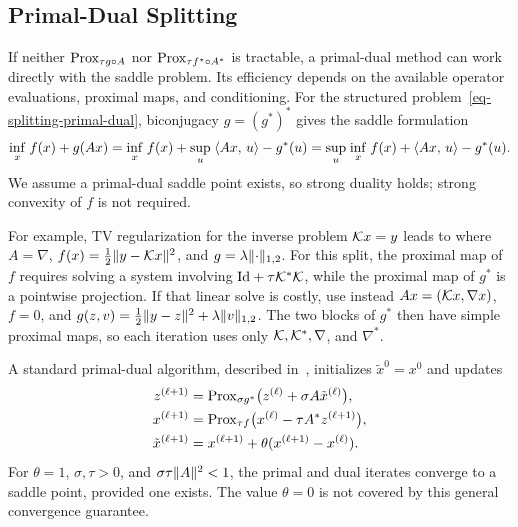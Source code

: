 \subsection{Primal-Dual Splitting}

If neither $\operatorname{Prox}_{\tau g \circ A}$ nor $\operatorname{Prox}_{\tau f^\star\circ A^*}$ is tractable, a primal-dual method can work directly with the saddle problem. Its efficiency depends on the available operator evaluations, proximal maps, and conditioning.
%
For the structured problem~\eqref{eq-splitting-primal-dual}, biconjugacy $g=(g^*)^*$ gives the saddle formulation
\begin{align}\label{eq-splitting-primal-dual-bis}
	\underset{x}{\inf}\; f(x) + g(Ax) = \underset{x}{\inf}\; f(x) + \underset{u}{\sup}\; \langle Ax,\,u\rangle - g^*(u)
	= \underset{u}{\sup}\; \underset{x}{\inf}\; f(x) + \langle Ax,\,u\rangle  - g^*(u).
\end{align}
We assume a primal-dual saddle point exists, so strong duality holds; strong convexity of $f$ is not required.

\begin{exmp}
For example, TV regularization for the inverse problem $\mathcal{K} x=y$ leads to
where $A=\nabla$, $f(x)=\frac{1}{2}\lVert y-\mathcal{K} x\rVert^2$, and $g=\lambda \lVert\cdot\rVert_{1,2}$.
%
For this split, the proximal map of $f$ requires solving a system involving $\mathrm{Id}+\tau\mathcal{K}^*\mathcal{K}$, while the proximal map of $g^*$ is a pointwise projection. If that linear solve is costly, use instead $A x=(\mathcal{K} x,\nabla x)$, $f=0$, and $g(z,v)=\frac12\lVert y-z\rVert^2+\lambda\lVert v\rVert_{1,2}$. The two blocks of $g^*$ then have simple proximal maps, so each iteration uses only $\mathcal{K},\mathcal{K}^*,\nabla$, and $\nabla^*$.
\end{exmp}

A standard primal-dual algorithm, described in~\cite{chambolle2016introduction}, initializes $\tilde x^0=x^0$ and updates
\begin{align*}
 z^{(\ell+1)}&=\operatorname{Prox}_{\sigma g^*}\bigl(z^{(\ell)}+\sigma A\tilde x^{(\ell)}\bigr),\\
 x^{(\ell+1)}&=\operatorname{Prox}_{\tau f}\bigl(x^{(\ell)}-\tau A^*z^{(\ell+1)}\bigr),\\
 \tilde x^{(\ell+1)}&=x^{(\ell+1)}+\theta(x^{(\ell+1)}-x^{(\ell)}).
\end{align*}
For $\theta=1$, $\sigma,\tau>0$, and $\sigma\tau\lVert A\rVert^2<1$, the primal and dual iterates converge to a saddle point, provided one exists. The value $\theta=0$ is not covered by this general convergence guarantee.
